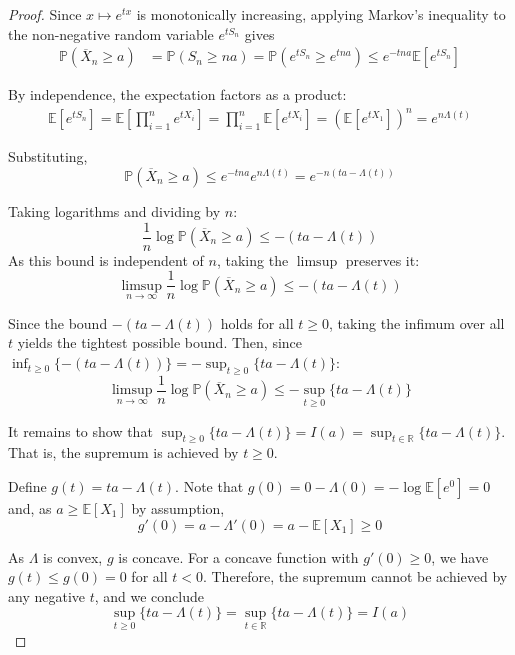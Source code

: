\documentclass{article}
\newcommand{\E}{\mathbb{E}}
\renewcommand{\P}{\mathbb{P}}
\newcommand{\R}{\mathbb{R}}
\begin{document}
\begin{proof}
  Since $x \mapsto e^{tx}$ is monotonically increasing, applying Markov's inequality to the non-negative random variable $e^{t S_n}$ gives
  \begin{align}
    \P(\overline{X}_n \ge a) &= \P(S_n \ge na)
    = \P(e^{t S_n} \ge e^{tna}) \le e^{-tna} \E[e^{t S_n}]
  \end{align}

  By independence, the expectation factors as a product:
  \begin{align}
    \E[e^{t S_n}] = \E\left[\prod_{i=1}^n e^{t X_i}\right]
    = \prod_{i=1}^n \E[e^{t X_i}]
    = \left( \E[e^{t X_1}] \right)^n
    = e^{n \Lambda(t)}
  \end{align}

  Substituting,
  \begin{equation}
    \P(\overline{X}_n \ge a) \le e^{-tna} e^{n \Lambda(t)} = e^{-n(ta - \Lambda(t))}
  \end{equation}

  Taking logarithms and dividing by $n$:
  \begin{equation}
    \frac{1}{n} \log \P(\overline{X}_n \ge a) \le -(ta - \Lambda(t))
  \end{equation}
  As this bound is independent of $n$, taking the $\limsup$ preserves it:
  \begin{equation}
    \limsup_{n \to \infty} \frac{1}{n} \log \P(\overline{X}_n \ge a) \le -(ta - \Lambda(t))
  \end{equation}

  Since the bound $-(ta - \Lambda(t))$ holds for all $t \ge 0$, taking the infimum over all $t$
  yields the tightest possible bound.
  Then, since $\inf_{t \ge 0} \{-(ta - \Lambda(t))\} = -\sup_{t \ge 0} \{ta - \Lambda(t)\}$:
  \begin{equation}
    \limsup_{n \to \infty} \frac{1}{n} \log \P(\overline{X}_n \ge a) \le -\sup_{t \ge 0} \{ ta - \Lambda(t) \}
  \end{equation}

  It remains to show that $\sup_{t \ge 0} \{ ta - \Lambda(t) \} = I(a) = \sup_{t \in \R} \{ ta - \Lambda(t) \}$. That is, the supremum is achieved by $t \ge 0$.

  Define $g(t) = ta - \Lambda(t)$. Note that $g(0) = 0 - \Lambda(0) = -\log \E[e^0] = 0$ and,
  as $a \ge \E[X_1]$ by assumption,
  \begin{equation}
    g'(0) = a - \Lambda'(0) = a - \E[X_1] \ge 0
  \end{equation}

  As $\Lambda$ is convex, $g$ is concave.
  For a concave function with $g'(0) \ge 0$, we have $g(t) \le g(0) = 0$ for all $t < 0$.
  Therefore, the supremum cannot be achieved by any negative $t$, and we conclude
  \begin{equation}
    \sup_{t \ge 0} \{ ta - \Lambda(t) \} = \sup_{t \in \R} \{ ta - \Lambda(t) \} = I(a)
  \end{equation}
\end{proof}
\end{document}
